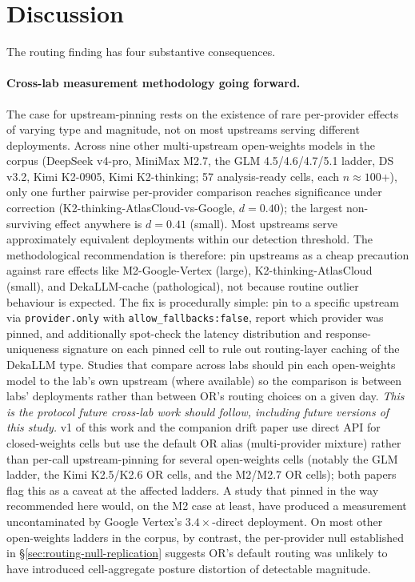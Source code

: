 \documentclass[11pt,a4paper]{article}
\begin{document}
\section{Discussion}
\label{sec:discussion}

The routing finding has four substantive consequences.

\begin{sloppypar}
\paragraph{Cross-lab measurement methodology going forward.} The case for upstream-pinning rests on the existence of rare per-provider effects of varying type and magnitude, not on most upstreams serving different deployments. Across nine other multi-upstream open-weights models in the corpus (DeepSeek v4-pro, MiniMax M2.7, the GLM 4.5/4.6/4.7/5.1 ladder, DS v3.2, Kimi K2-0905, Kimi K2-thinking; 57 analysis-ready cells, each $n \approx 100$+), only one further pairwise per-provider comparison reaches significance under correction (K2-thinking-AtlasCloud-vs-Google, $d{=}0.40$); the largest non-surviving effect anywhere is $d{=}0.41$ (small). Most upstreams serve approximately equivalent deployments within our detection threshold. The methodological recommendation is therefore: pin upstreams as a cheap precaution against rare effects like M2-Google-Vertex (large), K2-thinking-AtlasCloud (small), and DekaLLM-cache (pathological), not because routine outlier behaviour is expected. The fix is procedurally simple: pin to a specific upstream via \texttt{provider.only} with \texttt{allow\_fallbacks:\allowbreak false}, report which provider was pinned, and additionally spot-check the latency distribution and response-uniqueness signature on each pinned cell to rule out routing-layer caching of the DekaLLM type. Studies that compare across labs should pin each open-weights model to the lab's own upstream (where available) so the comparison is between labs' deployments rather than between OR's routing choices on a given day. \emph{This is the protocol future cross-lab work should follow, including future versions of this study.} v1 of this work \citep{tenner2026convergent} and the companion drift paper \citep{tenner2026drift} use direct API for closed-weights cells but use the default OR alias (multi-provider mixture) rather than per-call upstream-pinning for several open-weights cells (notably the GLM ladder, the Kimi K2.5/K2.6 OR cells, and the M2/M2.7 OR cells); both papers flag this as a caveat at the affected ladders. A study that pinned in the way recommended here would, on the M2 case at least, have produced a measurement uncontaminated by Google Vertex's $3.4\times$-direct deployment. On most other open-weights ladders in the corpus, by contrast, the per-provider null established in \S\ref{sec:routing-null-replication} suggests OR's default routing was unlikely to have introduced cell-aggregate posture distortion of detectable magnitude.
\end{sloppypar}
\end{document}

